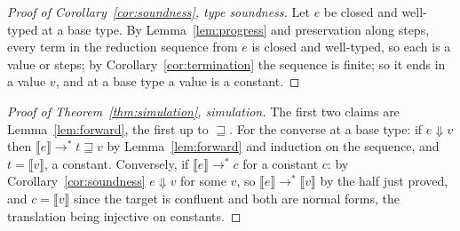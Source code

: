 \begin{proof}[Proof of Corollary~\ref{cor:soundness}, type soundness]
Let $e$ be closed and well-typed at a base type.
By Lemma~\ref{lem:progress} and preservation along steps, every term in the reduction sequence from $e$ is closed and well-typed, so each is a value or steps; by Corollary~\ref{cor:termination} the sequence is finite; so it ends in a value $v$, and at a base type a value is a constant.
\end{proof}

\begin{proof}[Proof of Theorem~\ref{thm:simulation}, simulation]
The first two claims are Lemma~\ref{lem:forward}, the first up to $\sqsupseteq$.
For the converse at a base type: if $e \Downarrow v$ then $\llbracket e \rrbracket \longrightarrow^{*} t \sqsupseteq v$ by Lemma~\ref{lem:forward} and induction on the sequence, and $t = \llbracket v \rrbracket$, a constant.
Conversely, if $\llbracket e \rrbracket \longrightarrow^{*} c$ for a constant $c$: by Corollary~\ref{cor:soundness} $e \Downarrow v$ for some $v$, so $\llbracket e \rrbracket \longrightarrow^{*} \llbracket v \rrbracket$ by the half just proved, and $c = \llbracket v \rrbracket$ since the target is confluent and both are normal forms, the translation being injective on constants.
\end{proof}

